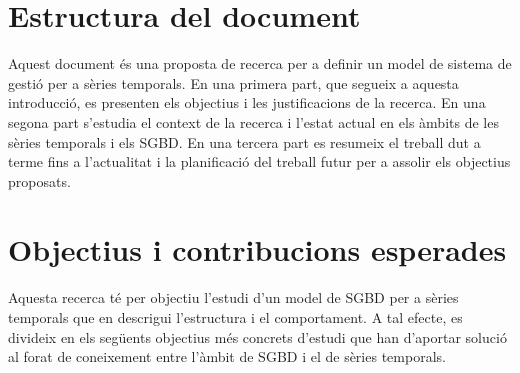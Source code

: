 \section{Estructura del document}

Aquest document és una proposta de recerca per a definir un model de
sistema de gestió per a sèries temporals. En una primera part, que
segueix a aquesta introducció, es presenten els objectius i les
justificacions de la recerca. En una segona part s'estudia el context
de la recerca i l'estat actual en els àmbits de les sèries temporals i
els SGBD. En una tercera part es resumeix el treball dut a terme fins
a l'actualitat i la planificació del treball futur per a assolir els
objectius proposats.




\section{Objectius i contribucions esperades}


Aquesta recerca té per objectiu l'estudi d'un model de SGBD per a
sèries temporals que en descrigui l'estructura i el comportament. A
tal efecte, es divideix en els següents objectius més concrets
d'estudi que han d'aportar solució al forat de coneixement entre
l'àmbit de SGBD i el de sèries temporals.



